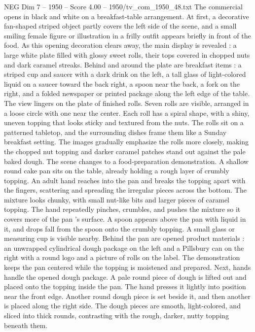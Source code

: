 \begin{textsample}{NEG Dim 7 – 1950 – Score 4.00 – 1950/tv\_com\_1950\_48.txt}  \label{ex:f7_neg_088}
The commercial opens in black and white on a breakfast-table arrangement.
At first, a decorative fan-shaped striped object partly covers the left side of the scene, and a small smiling female figure or illustration in a frilly outfit appears briefly in front of the food.
As this opening decoration clears away, the main display is revealed : a large white plate filled with glossy sweet rolls, their tops covered in chopped nuts and dark caramel streaks.
Behind and around the plate are breakfast items : a striped cup and saucer with a dark drink on the left, a tall glass of light-colored liquid on a saucer toward the back right, a spoon near the back, a fork on the right, and a folded newspaper or printed package along the left edge of the table.
The view lingers on the plate of finished rolls.
Seven rolls are visible, arranged in a loose circle with one near the center.
Each roll has a spiral shape, with a shiny, uneven topping that looks sticky and textured from the nuts.
The rolls sit on a patterned tabletop, and the surrounding dishes frame them like a Sunday breakfast setting.
The images gradually emphasize the rolls more closely, making the chopped nut topping and darker caramel patches stand out against the pale baked dough.
The scene changes to a food-preparation demonstration.
A shallow round cake pan sits on the table, already holding a rough layer of crumbly topping.
An adult hand reaches into the pan and breaks the topping apart with the fingers, scattering and spreading the irregular pieces across the bottom.
The mixture looks chunky, with small nut-like bits and larger pieces of caramel topping.
The hand repeatedly pinches, crumbles, and pushes the mixture so it covers more of the pan ’s surface.
A spoon appears above the pan with liquid in it, and drops fall from the spoon onto the crumbly topping.
A small glass or measuring cup is visible nearby.
Behind the pan are opened product materials : an unwrapped cylindrical dough package on the left and a Pillsbury can on the right with a round logo and a picture of rolls on the label.
The demonstration keeps the pan centered while the topping is moistened and prepared.
Next, hands handle the opened dough package.
A pale round piece of dough is lifted out and placed onto the topping inside the pan.
The hand presses it lightly into position near the front edge.
Another round dough piece is set beside it, and then another is placed along the right side.
The dough pieces are smooth, light-colored, and sliced into thick rounds, contrasting with the rough, darker, nutty topping beneath them.

\end{textsample}
